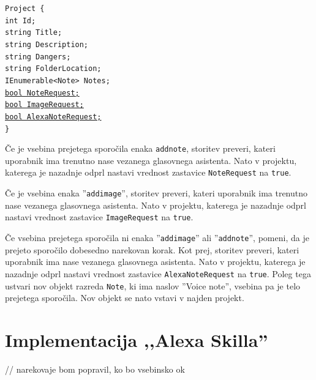 \documentclass[a4paper, 12pt]{book}
\begin{document}
\noindent \texttt{Project \{ \\
int Id; \\
string Title; \\
string Description; \\
string Dangers; \\
string FolderLocation; \\
IEnumerable<Note> Notes; \\
\underline{bool NoteRequest;} \\
\underline{bool ImageRequest;} \\
\underline{bool AlexaNoteRequest;} \\
\}
}



Če je vsebina prejetega sporočila enaka \texttt{addnote}, storitev preveri, kateri uporabnik ima trenutno nase vezanega glasovnega asistenta.
Nato v projektu, katerega je nazadnje odprl nastavi vrednost zastavice \texttt{NoteRequest} na \texttt{true}.


Če je vsebina enaka ''\texttt{addimage}'', storitev preveri, kateri uporabnik ima trenutno nase vezanega glasovnega asistenta.
Nato v projektu, katerega je nazadnje odprl nastavi vrednost zastavice \texttt{ImageRequest} na \texttt{true}.

Če vsebina prejetega sporočila ni enaka ''\texttt{addimage}'' ali ''\texttt{addnote}'', pomeni, da je prejeto sporočilo dobesedno narekovan korak.
Kot prej, storitev preveri, kateri uporabnik ima nase vezanega glasovnega asistenta.
Nato v projektu, katerega je nazadnje odprl nastavi vrednost zastavice \texttt{AlexaNoteRequest} na \texttt{true}.
Poleg tega ustvari nov objekt razreda \texttt{Note}, ki ima naslov ''Voice note'', vsebina pa je telo prejetega sporočila.
Nov objekt se nato vstavi v najden projekt.

% 
% 





\section{Implementacija ,,Alexa Skilla''}

// narekovaje bom popravil, ko bo vsebinsko ok
\end{document}
